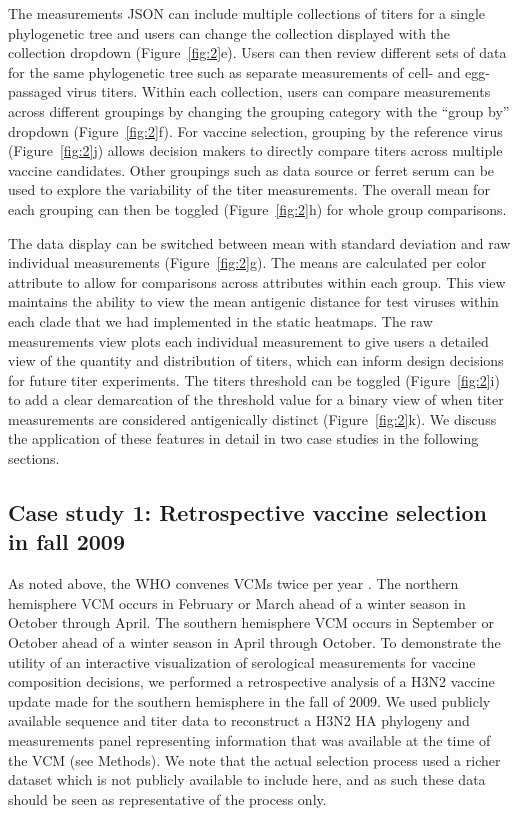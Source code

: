 \documentclass[utf8]{FrontiersinHarvard} %
\begin{document}
The measurements JSON can include multiple collections of titers for a single phylogenetic tree and users can change the collection displayed with the collection dropdown (Figure~\ref{fig:2}e).
Users can then review different sets of data for the same phylogenetic tree such as separate measurements of cell- and egg-passaged virus titers.
Within each collection, users can compare measurements across different groupings by changing the grouping category with the ``group by'' dropdown (Figure~\ref{fig:2}f).
For vaccine selection, grouping by the reference virus (Figure~\ref{fig:2}j) allows decision makers to directly compare titers across multiple vaccine candidates.
Other groupings such as data source or ferret serum can be used to explore the variability of the titer measurements.
The overall mean for each grouping can then be toggled (Figure~\ref{fig:2}h) for whole group comparisons.

The data display can be switched between mean with standard deviation and raw individual measurements (Figure~\ref{fig:2}g).
The means are calculated per color attribute to allow for comparisons across attributes within each group.
This view maintains the ability to view the mean antigenic distance for test viruses within each clade that we had implemented in the static heatmaps.
The raw measurements view plots each individual measurement to give users a detailed view of the quantity and distribution of titers, which can inform design decisions for future titer experiments.
The titers threshold can be toggled (Figure~\ref{fig:2}i) to add a clear demarcation of the threshold value for a binary view of when titer measurements are considered antigenically distinct (Figure~\ref{fig:2}k).
We discuss the application of these features in detail in two case studies in the following sections.

\subsection{Case study 1: Retrospective vaccine selection in fall 2009}

As noted above, the WHO convenes VCMs twice per year \citep{Morris:2017ea}.
The northern hemisphere VCM occurs in February or March ahead of a winter season in October through April.
The southern hemisphere VCM occurs in September or October ahead of a winter season in April through October.
To demonstrate the utility of an interactive visualization of serological measurements for vaccine composition decisions, we performed a retrospective analysis of a H3N2 vaccine update made for the southern hemisphere in the fall of 2009.
We used publicly available sequence and titer data \citep{Bedford:2014bf} to reconstruct a H3N2 HA phylogeny and measurements panel representing information that was available at the time of the VCM (see Methods).
We note that the actual selection process used a richer dataset which is not publicly available to include here, and as such these data should be seen as representative of the process only.
\end{document}
